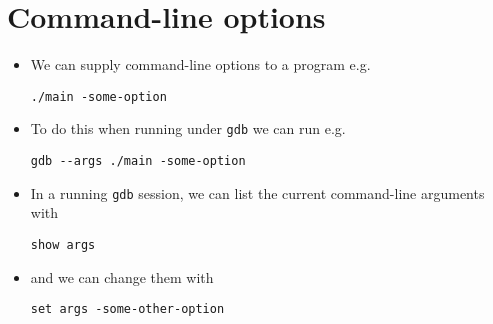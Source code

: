 \documentclass{article}
\begin{document}
\section{Command-line options}
\begin{itemize}
\item We can supply command-line options to a program e.g.
\begin{verbatim}
./main -some-option
\end{verbatim}
\item To do this when running under \verb!gdb! we can run e.g.
\begin{verbatim}
gdb --args ./main -some-option
\end{verbatim}
\item In a running \verb!gdb! session, we can list the current command-line arguments with
\begin{verbatim}
show args
\end{verbatim}
\item and we can change them with
\begin{verbatim}
set args -some-other-option
\end{verbatim}
\end{itemize}
\end{document}
